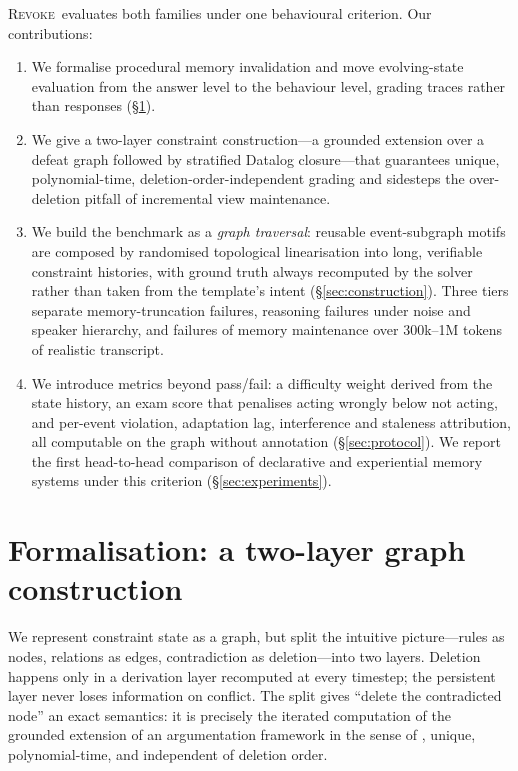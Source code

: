 \documentclass{article} %
\newcommand{\revoke}{\textsc{Revoke}}
\begin{document}
\revoke\ evaluates both families under one behavioural criterion. Our contributions:
\begin{enumerate}[leftmargin=*]
\item We formalise procedural memory invalidation and move evolving-state evaluation from the answer level to the behaviour level, grading traces rather than responses (\S\ref{sec:formal}).
\item We give a two-layer constraint construction---a grounded extension over a defeat graph followed by stratified Datalog closure---that guarantees unique, polynomial-time, deletion-order-independent grading and sidesteps the over-deletion pitfall of incremental view maintenance.
\item We build the benchmark as a \emph{graph traversal}: reusable event-subgraph motifs are composed by randomised topological linearisation into long, verifiable constraint histories, with ground truth always recomputed by the solver rather than taken from the template's intent (\S\ref{sec:construction}). Three tiers separate memory-truncation failures, reasoning failures under noise and speaker hierarchy, and failures of memory maintenance over 300k--1M tokens of realistic transcript.
\item We introduce metrics beyond pass/fail: a difficulty weight derived from the state history, an exam score that penalises acting wrongly below not acting, and per-event violation, adaptation lag, interference and staleness attribution, all computable on the graph without annotation (\S\ref{sec:protocol}). We report the first head-to-head comparison of declarative and experiential memory systems under this criterion (\S\ref{sec:experiments}).
\end{enumerate}

\section{Formalisation: a two-layer graph construction}
\label{sec:formal}

We represent constraint state as a graph, but split the intuitive picture---rules as nodes, relations as edges, contradiction as deletion---into two layers. Deletion happens only in a derivation layer recomputed at every timestep; the persistent layer never loses information on conflict. The split gives ``delete the contradicted node'' an exact semantics: it is precisely the iterated computation of the grounded extension of an argumentation framework in the sense of \citet{dung1995acceptability}, unique, polynomial-time, and independent of deletion order.
\end{document}
